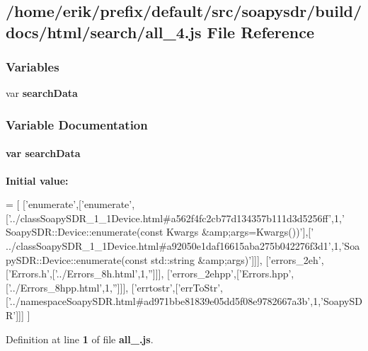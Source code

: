 \subsection{/home/erik/prefix/default/src/soapysdr/build/docs/html/search/all\+\_\+4.js File Reference}
\label{all__4_8js}
\subsubsection*{Variables}
\begin{DoxyCompactItemize}
\item 
var {\bf search\+Data}
\end{DoxyCompactItemize}


\subsubsection{Variable Documentation}
\paragraph[{search\+Data}]{\setlength{\rightskip}{0pt plus 5cm}var search\+Data}\label{all__4_8js_ad01a7523f103d6242ef9b0451861231e}
{\bfseries Initial value\+:}
\begin{DoxyCode}
=
[
  [\textcolor{stringliteral}{'enumerate'},[\textcolor{stringliteral}{'enumerate'},[\textcolor{stringliteral}{'../classSoapySDR\_1\_1Device.html#a562f4fc2cb77d134357b111d3d5256ff'},1,\textcolor{stringliteral}{'
      SoapySDR::Device::enumerate(const Kwargs &amp;args=Kwargs())'}],[\textcolor{stringliteral}{'
      ../classSoapySDR\_1\_1Device.html#a92050e1daf16615aba275b042276f3d1'},1,\textcolor{stringliteral}{'SoapySDR::Device::enumerate(const std::string &amp;args)'}]]],
  [\textcolor{stringliteral}{'errors\_2eh'},[\textcolor{stringliteral}{'Errors.h'},[\textcolor{stringliteral}{'../Errors\_8h.html'},1,\textcolor{stringliteral}{''}]]],
  [\textcolor{stringliteral}{'errors\_2ehpp'},[\textcolor{stringliteral}{'Errors.hpp'},[\textcolor{stringliteral}{'../Errors\_8hpp.html'},1,\textcolor{stringliteral}{''}]]],
  [\textcolor{stringliteral}{'errtostr'},[\textcolor{stringliteral}{'errToStr'},[\textcolor{stringliteral}{'../namespaceSoapySDR.html#ad971bbe81839e05dd5f08e9782667a3b'},1,\textcolor{stringliteral}{'SoapySDR'}]]]
]
\end{DoxyCode}


Definition at line {\bf 1} of file {\bf all\+\_.\+js}.

